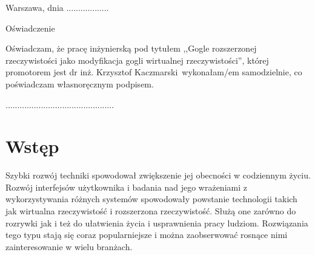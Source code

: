 \documentclass[a4paper,11pt,twoside]{report}
\theoremstyle{definition}
\newcommand{\tytul}{Gogle rozszerzonej rzeczywistości jako modyfikacja gogli wirtualnej rzeczywistości}
\renewcommand{\title}{Augmented Reality googles as modified Virtual Reality googles}
\newcommand{\type}{inżyniers} %
\newcommand{\supervisor}{dr inż. Krzysztof Kaczmarski}
\begin{document}
\null\thispagestyle{empty}\newpage

\null \hfill Warszawa, dnia ..................\\

\par\vspace{5cm}

\begin{center}
Oświadczenie %
\end{center}

\indent Oświadczam, że pracę \type ką pod
tytułem ,,\tytul '', której promotorem jest \supervisor \ wykonałam/em
samodzielnie, co poświadczam własnoręcznym podpisem.
\vspace{2cm}



\begin{flushright}
  \begin{minipage}{50mm}
    \begin{center}
      ..............................................

    \end{center}
  \end{minipage}
\end{flushright}

\thispagestyle{empty}
\newpage

\null\thispagestyle{empty}\newpage

\tableofcontents
\thispagestyle{empty}
\newpage
\null\thispagestyle{empty}\newpage
\setcounter{page}{11}
\pagestyle{fancy}


\chapter*{Wstęp} %

Szybki rozwój techniki spowodował zwiększenie jej obecności w codziennym życiu. Rozwój interfejsów użytkownika i badania nad jego wrażeniami z wykorzystywania różnych systemów spowodowały powstanie technologii takich jak wirtualna rzeczywistość i rozszerzona rzeczywistość. Służą one zarówno do rozrywki jak i też do ułatwienia życia i usprawnienia pracy ludziom. Rozwiązania tego typu stają się coraz popularniejsze i można zaobserwować rosnące nimi zainteresowanie w wielu branżach.
\end{document}
